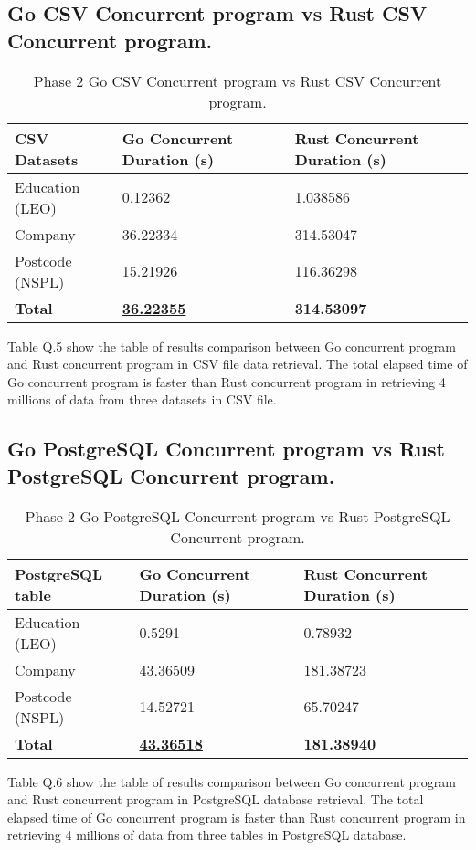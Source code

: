 \subsection{Go CSV Concurrent program vs Rust CSV Concurrent program.}

\begin{table}[H]
	\centering
	\begin{tabulary}{1.0\textwidth}{|L|L|L|}
		\hline
		{\bf{CSV Datasets}} & {\bf Go Concurrent Duration (s)} & {\bf Rust Concurrent Duration (s)}  \\ \hline
		Education (LEO)		& 0.12362     			  	   & 1.038586                  	 \\ \hline
		Company				& 36.22334   				   & 314.53047                       \\ \hline
		Postcode (NSPL) 	& 15.21926       			   & 116.36298                       \\ \hline
		\bf{Total}   		& \bf{\underline{36.22355}}  	& \textbf{314.53097}       \\ \hline
	\end{tabulary}
	\caption{Phase 2 Go CSV Concurrent program vs Rust CSV Concurrent program.}
\end{table}

Table Q.5 show the table of results comparison between Go concurrent program and Rust concurrent program in CSV file data retrieval. The total elapsed time of Go concurrent program is faster than Rust concurrent program in retrieving 4 millions of data from three datasets in CSV file.

\newpage

\subsection{Go PostgreSQL Concurrent program vs Rust PostgreSQL Concurrent program.}

\begin{table}[H]
	\centering
	\begin{tabulary}{1.0\textwidth}{|L|L|L|}
		\hline
		{\bf{PostgreSQL table}} & {\bf Go Concurrent Duration (s)} & {\bf Rust Concurrent Duration (s)}  \\ \hline
		Education (LEO)		& 0.5291     			  	   & 0.78932              	 \\ \hline
		Company				& 43.36509   				   & 181.38723                       \\ \hline
		Postcode (NSPL) 	& 14.52721       			   & 65.70247                       \\ \hline
		\bf{Total}   		& \bf{\underline{43.36518}}  	& \textbf{181.38940}       \\ \hline
	\end{tabulary}
	\caption{Phase 2 Go PostgreSQL Concurrent program vs Rust PostgreSQL Concurrent program.}
\end{table}

Table Q.6 show the table of results comparison between Go concurrent program and Rust concurrent program in PostgreSQL database retrieval. The total elapsed time of Go concurrent program is faster than Rust concurrent program in retrieving 4 millions of data from three tables in PostgreSQL database.



